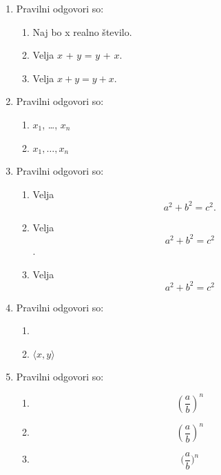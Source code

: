 \documentclass[11pt]{article}
\begin{document}
\begin{enumerate}
    \item Pravilni odgovori so: %
    \begin{enumerate}
        \item Naj bo x realno število.
        \item Velja \(x\) + \(y\) = \(y\) + \(x\).
        \item Velja \(x + y = y + x\).
    \end{enumerate}

    \item Pravilni odgovori so: %
    \begin{enumerate}
        \item \(x_1\), \dots, \(x_n\)
        \item \(x_1, \ldots, x_n\)
    \end{enumerate}

    \item Pravilni odgovori so: %
    \begin{enumerate}
        \item
Velja
\[
  a^2 + b^2 = c^2.
\]
        \item
Velja
\[
  a^2 + b^2 = c^2
\]
.
        \item
Velja
\[
  a^2 + b^2 = c^2
\]
    \end{enumerate}

    \item Pravilni odgovori so: %
    \begin{enumerate}
        \item \(<x, y>\)
        \item \(\langle x, y \rangle\)
    \end{enumerate}

    \item Pravilni odgovori so: %
    \begin{enumerate}
        \item \[ (\frac{a}{b})^n \]
        \item \[ \left(\frac{a}{b}\right)^n \]
        \item \[ \Big(\frac{a}{b}\Big)^n \]
    \end{enumerate}


\end{enumerate}
\end{document}
